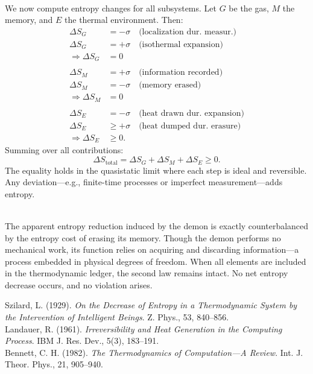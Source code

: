 \begin{technical}
\vspace{1.5em}
\\[0.5em]
We now compute entropy changes for all subsystems. Let \( G \) be the gas, \( M \) the memory, and \( E \) the thermal environment. Then:
\begin{align*}
\Delta S_G &= -\sigma \quad \text{(localization dur. measur.)} \\
\Delta S_G &= +\sigma \quad \text{(isothermal expansion)} \\
\Rightarrow \Delta S_G &= 0 \\
\\[0.5em]
\Delta S_M &= +\sigma \quad \text{(information recorded)} \\
\Delta S_M &= -\sigma \quad \text{(memory erased)} \\
\Rightarrow \Delta S_M &= 0 \\
\\[0.5em]
\Delta S_E &= -\sigma \quad \text{(heat drawn dur. expansion)} \\
\Delta S_E &\geq +\sigma \quad \text{(heat dumped dur. erasure)} \\
\Rightarrow \Delta S_E &\geq 0.
\end{align*}
Summing over all contributions:
\[
\Delta S_{\text{total}} = \Delta S_G + \Delta S_M + \Delta S_E \geq 0.
\]
The equality holds in the quasistatic limit where each step is ideal and reversible. Any deviation—e.g., finite-time processes or imperfect measurement—adds entropy.

\vspace{0.5em}
\\[0.5em]
The apparent entropy reduction induced by the demon is exactly counterbalanced by the entropy cost of erasing its memory. Though the demon performs no mechanical work, its function relies on acquiring and discarding information—a process embedded in physical degrees of freedom. When all elements are included in the thermodynamic ledger, the second law remains intact. No net entropy decrease occurs, and no violation arises.

\techref
{\footnotesize
Szilard, L. (1929). \textit{On the Decrease of Entropy in a Thermodynamic System by the Intervention of Intelligent Beings}. Z. Phys., 53, 840–856.\\
Landauer, R. (1961). \textit{Irreversibility and Heat Generation in the Computing Process}. IBM J. Res. Dev., 5(3), 183–191.\\
Bennett, C. H. (1982). \textit{The Thermodynamics of Computation—A Review}. Int. J. Theor. Phys., 21, 905–940.
}
\end{technical}
